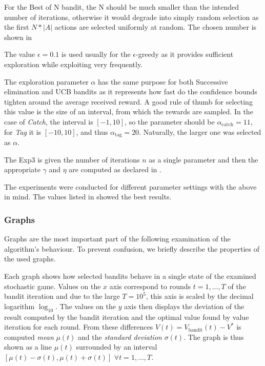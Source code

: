 \documentclass[../main.tex]{subfiles}
\begin{document}
For the Best of N bandit, the N should be much smaller than the intended number of iterations, otherwise it would degrade into simply random selection as the first $N * |A|$ actions are selected uniformly at random.
The chosen number is shown in 

The value $\epsilon = 0.1$ is used usually for the $\epsilon$-greedy as it provides sufficient exploration while exploiting very frequently.

The exploration parameter $\alpha$ has the same purpose for both Successive elimination and UCB bandits as it represents how fast do the confidence bounds tighten around the average received reward.
A good rule of thumb for selecting this value is the size of an interval, from which the rewards are sampled.
In the case of \textit{Catch}, the interval is $\left[-1, 10\right]$, so the parameter should be $\alpha_{\text{catch}} = 11$, for \textit{Tag} it is $\left[-10, 10\right]$, and thus $\alpha_{\text{tag}} = 20$.
Naturally, the larger one was selected as $\alpha$.

The Exp3 is given the number of iterations $n$ as a single parameter and then the appropriate $\gamma$ and $\eta$ are computed as declared in .

The experiments were conducted for different parameter settings with the above in mind.
The values listed in  showed the best results.

\subsubsection{Graphs}\label{exp:sg:env:graphs}
Graphs are the most important part of the following examination of the algorithm's behaviour.
To prevent confusion, we briefly describe the properties of the used graphs.

Each graph shows how selected bandits behave in a single state of the examined stochastic game.
Values on the $x$ axis correspond to rounds $t = 1, \dots, T$ of the bandit iteration and due to the large $T = 10^5$, this axis is scaled by the decimal logarithm $\log_{10}$.
The values on the $y$ axis then displays the deviation of the result computed by the bandit iteration and the optimal value found by value iteration for each round.
From these differences $V(t) = V_{\text{bandit}}(t) - V^*$ is computed \textit{mean} $\mu(t)$ and the \textit{standard deviation} $\sigma(t)$.
The graph is thus shown as a line $\mu(t)$ surrounded by an interval $\left[\mu(t) - \sigma(t), \mu(t) + \sigma(t)\right]$ $\forall t = 1, \dots, T$.
\end{document}
